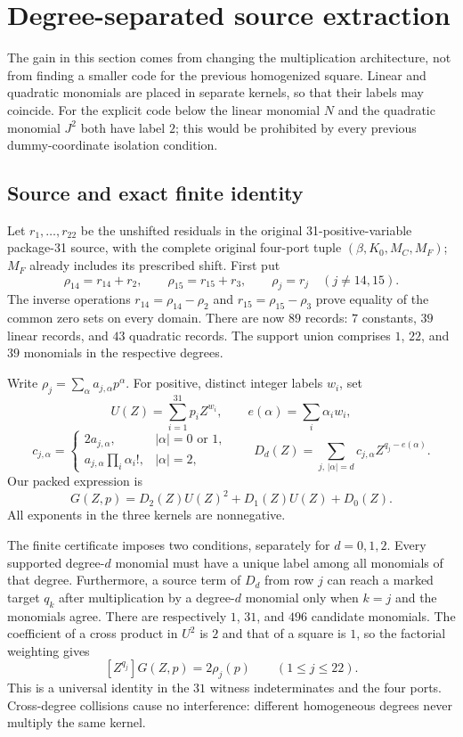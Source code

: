 \section{Degree-separated source extraction}
\label{sec:degree-separated-source}
The gain in this section comes from changing the multiplication architecture,
not from finding a smaller code for the previous homogenized square.  Linear
and quadratic monomials are placed in separate kernels, so that their labels
may coincide.  For the explicit code below the linear monomial $N$ and the
quadratic monomial $J^2$ both have label $2$; this would be prohibited by every
previous dummy-coordinate isolation condition.

\subsection{Source and exact finite identity}
Let $r_1,\ldots,r_{22}$ be the unshifted residuals in the original
31-positive-variable package-31 source, with the complete original four-port
tuple $(\beta,K_0,M_C,M_F)$; $M_F$ already includes its prescribed shift.
First put
\[
 \rho_{14}=r_{14}+r_2,\qquad \rho_{15}=r_{15}+r_3,
 \qquad \rho_j=r_j\quad(j\ne14,15).
\]
The inverse operations $r_{14}=\rho_{14}-\rho_2$ and
$r_{15}=\rho_{15}-\rho_3$ prove equality of the common zero sets on every
domain.  There are now $89$ records: $7$ constants, $39$ linear records, and
$43$ quadratic records.  The support union comprises $1$, $22$, and $39$
monomials in the respective degrees.

Write $\rho_j=\sum_\alpha a_{j,\alpha}p^\alpha$.  For positive, distinct
integer labels $w_i$, set
\[
 U(Z)=\sum_{i=1}^{31}p_i Z^{w_i},\qquad
 e(\alpha)=\sum_i\alpha_iw_i,
\]
\[
 c_{j,\alpha}=
 \begin{cases}
  2a_{j,\alpha},&|\alpha|=0\text{ or }1,\\
  a_{j,\alpha}\prod_i\alpha_i!,&|\alpha|=2,
 \end{cases}
 \qquad
 D_d(Z)=\sum_{j,\,|\alpha|=d}c_{j,\alpha}Z^{q_j-e(\alpha)}.
\]
Our packed expression is
\begin{equation}\label{eq:split-G}
 G(Z,p)=D_2(Z)U(Z)^2+D_1(Z)U(Z)+D_0(Z).
\end{equation}
All exponents in the three kernels are nonnegative.

The finite certificate imposes two conditions, separately for $d=0,1,2$.
Every supported degree-$d$ monomial must have a unique label among all
monomials of that degree.  Furthermore, a source term of $D_d$ from row $j$
can reach a marked target $q_k$ after multiplication by a degree-$d$
monomial only when $k=j$ and the monomials agree.  There are respectively
$1$, $31$, and $496$ candidate monomials.  The coefficient of a cross product
in $U^2$ is $2$ and that of a square is $1$, so the factorial weighting gives
\begin{equation}\label{eq:split-extraction}
 [Z^{q_j}]G(Z,p)=2\rho_j(p)\qquad(1\le j\le22).
\end{equation}
This is a universal identity in the $31$ witness indeterminates and the four
ports.  Cross-degree collisions cause no interference: different homogeneous
degrees never multiply the same kernel.

